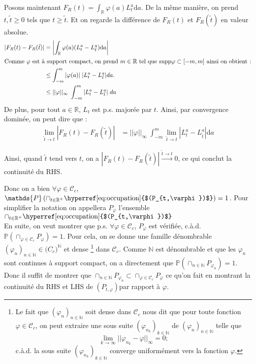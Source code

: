 \documentclass[openany]{book}
\makeatletter
\renewcommand{\P}{\mathds{P}}
\newcommand{\R}{\mathbb{R}}
\newcommand{\1}{\mathbbm{1}}
\newcommand{\supp}{\text{supp}}
\newcommand{\refocc}{\hyperref[eq:occupation]{$(P_{t,\varphi})$}}
\renewcommand{\d}{\mathrm{d}}
\renewenvironment{proof}[1][\textbf{\textit{Démonstration}}]{%
  \par\pushQED{\qed}%
  \normalfont\topsep6\p@\@plus6\p@\relax
  \trivlist\item[\hskip\labelsep
    #1\@addpunct{.}]\ignorespaces
}{%
  \popQED\endtrivlist\@endpefalse
}
\theoremstyle{thmfont}
\theoremstyle{deffont}
\theoremstyle{thmfont}
\theoremstyle{deffont}
\makeatother
\begin{document}
\begin{proof}
\begin{itemize}
    Posons maintenant $F_R(t) = \int_\R \varphi(a) L_t^a\d a$. De la même manière, on prend $t, \tilde{t} \geq 0$ tels que $t \geq \tilde{t}$. Et on regarde la différence de $F_R(t)$ et $F_R(\tilde{t})$ en valeur absolue.
    \begin{align*}
      |F_R(t) - F_R(\tilde{t})| &= \left|\int_\R \varphi(a) (L_t^a - L_{\tilde{t}}^a)\d a\right|\\
      \shortintertext{Comme $\varphi$ est à support compact, on prend $m \in \R$ tel que $\supp{\varphi} \subset[-m,m]$ ainsi on obtient :}
                                &\leq \int_{-m}^m |\varphi(a)|\; |L_t^a - L_{\tilde{t}}^a|da.\\
                                & \leq ||\varphi||_\infty\; \int_{-m}^m |L_t^a - L_{\tilde t}^a|\;da
\end{align*}
De plus, pour tout $a \in \R$, $L_t$ est p.s. majorée par $t$. Ainsi, par convergence dominée, on peut dire que :
\begin{align*}
  \lim_{\tilde t \to t}|F_R(t) - F_R(\tilde{t})| %
                                               &= ||\varphi||_\infty\;\int_{-m}^{m} \lim_{\tilde t \to t} |L_t^a - L_{\tilde t}^a |\d a
    \end{align*}

    Ainsi, quand $\tilde{t}$ tend vers $t$, on a $|F_R(t) - F_R(\tilde{t})| \xrightarrow{\tilde t \to t} 0$, ce qui conclut la continuité du RHS.
    \end{itemize}
    Donc on a bien $\forall \varphi \in \mathcal C_c$, $\P\left(\cap_{t\in \R^+} \text{\refocc}\right) = 1$. Pour simplifier la notation on appellera $P_\varphi$ l'ensemble $\cap_{t\in \R^+} \text{\refocc}$\\

    En suite, on veut montrer que p.s. $\forall \varphi \in \mathcal C_c$, $P_\varphi$ est vérifiée, c.à.d. $\P(\cap_{\varphi \in \mathcal C_c} P_\varphi) = 1$. Pour cela, on se donne une famille dénombrable $(\varphi_n)_{n\in \mathbb N} \in \mathcal (C_c)^{\mathbb N}$ et dense
 \footnote{Le fait que $(\varphi_n)_{n\in\mathbb{N}}$ soit dense dans $\mathcal C_c$ nous dit que pour toute fonction $\varphi \in \mathcal C_c$, on peut extraire une sous suite $(\varphi_{n_k})_{k\in \mathbb{N}}$ de $(\varphi_n)_{n\in\mathbb{N}}$ telle que $$\lim_{k \to \infty}||\varphi_{n_k} - \varphi||_\infty = 0;$$ c.à.d. la sous suite $(\varphi_{n_k})_{k\in\mathbb{N}}$ converge uniformément vers la fonction $\varphi$. }
 dans $\mathcal C_c$. Comme $\mathbb N$ est dénombrable et que les $\varphi_n$ sont continues à support compact, on a directement que $\P(\cap_{n\in \mathbb N}P_{\varphi_n})=1$. Donc il suffit de montrer que $\cap_{n\in \mathbb N} P_{\varphi_n} \subset \cap_{\varphi \in \mathcal C_c} P_\varphi$ ce qu'on fait en montrant la continuité du RHS et LHS de \refocc par rapport à $\varphi$.


\end{proof}
\end{document}
